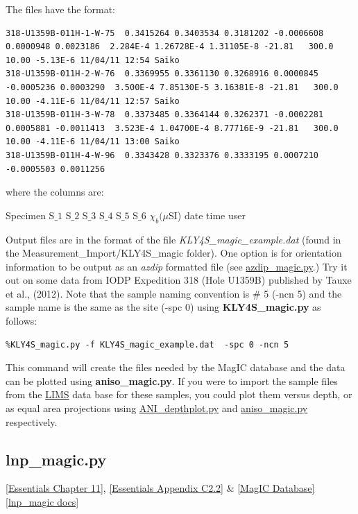 \documentclass[11pt]{book}
\begin{document}
{{The files have the format:
\begin{verbatim}
318-U1359B-011H-1-W-75  0.3415264 0.3403534 0.3181202 -0.0006608 0.0000948 0.0023186  2.284E-4 1.26728E-4 1.31105E-8 -21.81   300.0   10.00 -5.13E-6 11/04/11 12:54 Saiko
318-U1359B-011H-2-W-76  0.3369955 0.3361130 0.3268916 0.0000845 -0.0005236 0.0003290  3.500E-4 7.85130E-5 3.16381E-8 -21.81   300.0   10.00 -4.11E-6 11/04/11 12:57 Saiko
318-U1359B-011H-3-W-78  0.3373485 0.3364144 0.3262371 -0.0002281 0.0005881 -0.0011413  3.523E-4 1.04700E-4 8.77716E-9 -21.81   300.0   10.00 -4.11E-6 11/04/11 13:00 Saiko
318-U1359B-011H-4-W-96  0.3343428 0.3323376 0.3333195 0.0007210 -0.0005503 0.0011256
 \end{verbatim}
 where the columns are:

 Specimen S$\_1$  S$\_2$ S$\_3$  S$\_4$ S$\_5$ S$\_6$ $\chi_b (\mu$SI) date time user


Output files are in the format of the file {\it KLY4S\_magic\_example.dat} (found in the Measurement\_Import/KLY4S\_magic folder).  One option is for orientation information to be output as an {\it azdip} formatted file (see \href{#azdip_magic.py}{azdip\_magic.py}.)
Try it out on some data from IODP Expedition 318 (Hole U1359B) published by Tauxe et al., (2012).  Note that the sample naming convention is \# 5 (-ncn 5)  and the sample name is the same as the site (-spc 0) \nocite{tauxe12} using  {\bf KLY4S\_magic.py} as follows:

\begin{verbatim}
%KLY4S_magic.py -f KLY4S_magic_example.dat  -spc 0 -ncn 5
\end{verbatim}

This command will create the files needed by the MagIC database and the data can be plotted using {\bf aniso\_magic.py}.    If you were to import the sample files from the \href{#LIMS}{LIMS} data base for these samples, you could plot them versus depth, or as equal area projections using \href{#ANI_depthplot.py}{ANI\_depthplot.py} and \href{#aniso_magic.py}{aniso\_magic.py} respectively.





\subsection{lnp\_magic.py}
\href{http://earthref.org/MAGIC/books/Tauxe/Essentials/WebBook3ch11.html#ch11}{ [Essentials Chapter 11]},  \href{http://earthref.org/MAGIC/books/Tauxe/Essentials/WebBook3ap3.html#linesNplanes}{[Essentials Appendix C2.2]} \& \href{#MagICDatabase}{[MagIC Database]}
\href{https://github.com/PmagPy/PmagPy/blob/master/programs/lnp_magic.py}{[lnp\_magic docs]}

}}
\end{document}
